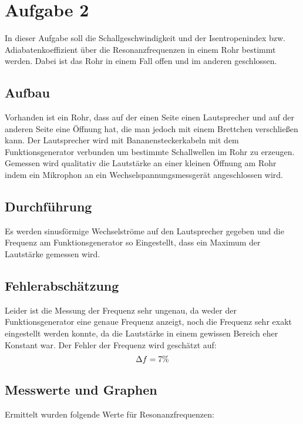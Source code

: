\newpage
\section{Aufgabe 2}
In dieser Aufgabe soll die Schallgeschwindigkeit und der Isentropenindex bzw. Adiabatenkoeffizient über die Resonanzfrequenzen in einem Rohr bestimmt werden. Dabei ist das Rohr in einem Fall offen und im anderen geschlossen.
\subsection{Aufbau}
Vorhanden ist ein Rohr, dass auf der einen Seite einen Lautsprecher und auf der anderen Seite eine Öffnung hat, die man jedoch mit einem Brettchen verschließen kann. Der Lautsprecher wird mit Bananensteckerkabeln mit dem Funktionsgenerator verbunden um bestimmte Schallwellen im Rohr zu erzeugen. Gemessen wird qualitativ die Lautstärke an einer kleinen Öffnung am Rohr indem ein Mikrophon an ein Wechselspannungsmessgerät angeschlossen wird.
\subsection{Durchführung}
Es werden sinusförmige Wechselströme auf den Lautsprecher gegeben und die Frequenz am Funktionsgenerator so Eingestellt, dass ein Maximum der Lautstärke gemessen wird.
\subsection{Fehlerabschätzung}
Leider ist die Messung der Frequenz sehr ungenau, da weder der Funktionsgenerator eine genaue Frequenz anzeigt, noch die Frequenz sehr exakt eingestellt werden konnte, da die Lautstärke in einem gewissen Bereich eher Konstant war. Der Fehler der Frequenz wird geschätzt auf:
\begin{equation}
\Delta f = 7\% \notag
\end{equation}
\newpage
\subsection{Messwerte und Graphen}
Ermittelt wurden folgende Werte für Resonanzfrequenzen:

